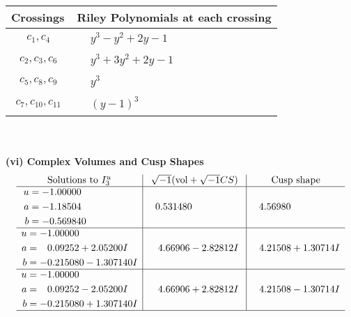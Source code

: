 \documentclass[1p]{elsarticle_modified}
\theoremstyle{definition}
\newcommand{\I}{\sqrt{-1}}
\begin{document}
\begin{tabular}{m{50pt}|m{274pt}}
Crossings & \hspace{64pt}Riley Polynomials at each crossing \\
\hline $$\begin{aligned}c_{1},c_{4}\end{aligned}$$&$\begin{aligned}
&y^3- y^2+2 y-1
\end{aligned}$\\
\hline $$\begin{aligned}c_{2},c_{3},c_{6}\end{aligned}$$&$\begin{aligned}
&y^3+3 y^2+2 y-1
\end{aligned}$\\
\hline $$\begin{aligned}c_{5},c_{8},c_{9}\end{aligned}$$&$\begin{aligned}
&y^3
\end{aligned}$\\
\hline $$\begin{aligned}c_{7},c_{10},c_{11}\end{aligned}$$&$\begin{aligned}
&(y-1)^3
\end{aligned}$\\
\hline
\end{tabular}\\~\\
\newpage\flushleft \textbf{(vi) Complex Volumes and Cusp Shapes}
$$\begin{array}{c|c|c}  
\text{Solutions to }I^u_{3}& \I (\text{vol} + \sqrt{-1}CS) & \text{Cusp shape}\\
 \hline 
\begin{aligned}
u &= -1.00000\phantom{ +0.000000I} \\
a &= -1.18504\phantom{ +0.000000I} \\
b &= -0.569840\phantom{ +0.000000I}\end{aligned}
 & \phantom{-}0.531480\phantom{ +0.000000I} & \phantom{-}4.56980\phantom{ +0.000000I} \\ \hline\begin{aligned}
u &= -1.00000\phantom{ +0.000000I} \\
a &= \phantom{-}0.09252 + 2.05200 I \\
b &= -0.215080 - 1.307140 I\end{aligned}
 & \phantom{-}4.66906 - 2.82812 I & \phantom{-}4.21508 + 1.30714 I \\ \hline\begin{aligned}
u &= -1.00000\phantom{ +0.000000I} \\
a &= \phantom{-}0.09252 - 2.05200 I \\
b &= -0.215080 + 1.307140 I\end{aligned}
 & \phantom{-}4.66906 + 2.82812 I & \phantom{-}4.21508 - 1.30714 I\\
 \hline 
 \end{array}$$\newpage
\end{document}
